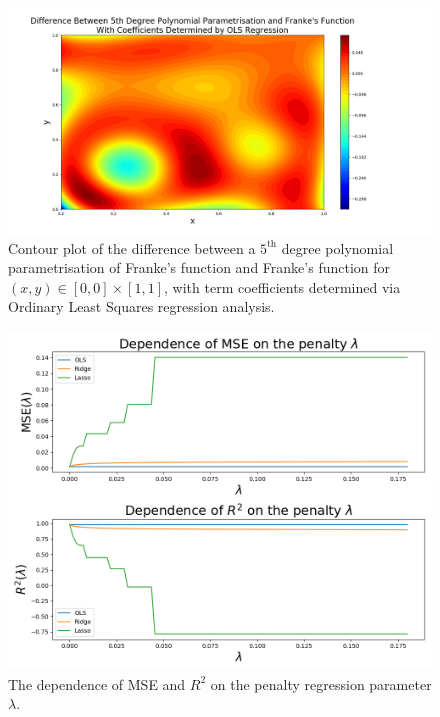 \documentclass[reprint,english]{revtex4-1}
\begin{document}
\begin{figure}[h]
\centering
\includegraphics[scale=0.25,clip,trim={2cm 0cm 4cm 0cm}]{results/FrankeApprox2/diff_deg5_OLS.png}
\caption{Contour plot of the difference between a \(5^{\text{th}}\) degree polynomial parametrisation of Franke's function and Franke's function for \((x,y)\in[0,0]\times[1,1]\), with term coefficients determined via Ordinary Least Squares regression analysis.}\label{fig:franke_difference_ols}
\end{figure}

\begin{figure}[h]
\centering
\includegraphics[scale=0.3,clip,trim={0cm 0cm 0cm 0cm}]{results/FrankeApprox3/error1_deg5.png}
\caption{The dependence of MSE and \(R^2\) on the penalty regression parameter \(\lambda\).}\label{fig:error_penalty_dependence2}
\end{figure}
\end{document}
